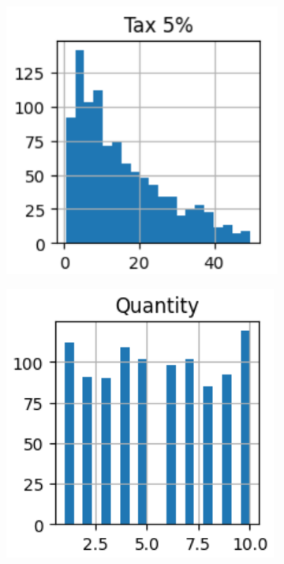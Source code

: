 \begin{figure}[h]
\begin{subfigure}[b]{0.2\textwidth}
    \end{subfigure}
    \hspace{0.05\textwidth} %
    \begin{subfigure}[b]{0.2\textwidth}
        \includegraphics[width=\textwidth]{Chapters/ch1/tax.png}
    \end{subfigure}
    \hspace{0.05\textwidth} %
    \begin{subfigure}[b]{0.2\textwidth}
        \includegraphics[width=\textwidth]{Chapters/ch1/quantity.png}

\end{subfigure}
\end{figure}
